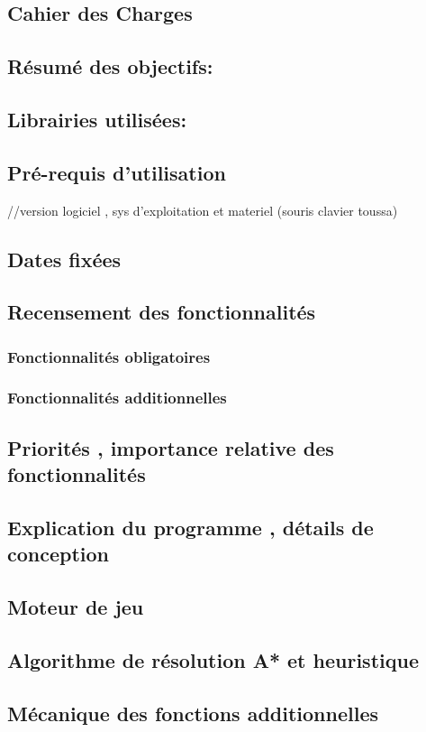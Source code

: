 \documentclass{article}
\begin{document}
\newpage
\begin{center}
	\section{Cahier des Charges}
	
		\subsection{Résumé des objectifs:}
		\subsection{Librairies utilisées:}
		\subsection{Pré-requis d'utilisation}//version logiciel , sys d'exploitation et materiel (souris clavier toussa)
		\subsection{Dates fixées}
		\subsection{Recensement des fonctionnalités}
			\subsubsection{Fonctionnalités obligatoires}
			\subsubsection{Fonctionnalités additionnelles}
		\subsection{Priorités , importance relative des fonctionnalités}
\end{center}

\newpage
\begin{center}
	\section{Explication du programme , détails de conception}
		\subsection{Moteur de jeu}
		\subsection{Algorithme de résolution A* et heuristique}
		\subsection{Mécanique des fonctions additionnelles}
\end{center}
\end{document}
